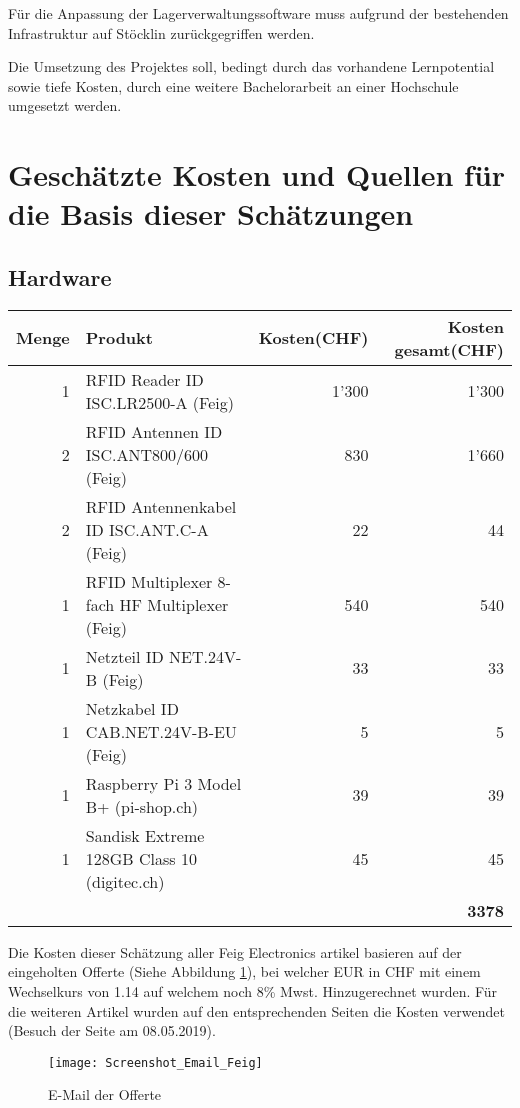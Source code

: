 Für die Anpassung der Lagerverwaltungssoftware muss aufgrund der bestehenden Infrastruktur auf Stöcklin zurückgegriffen werden.

Die Umsetzung des Projektes soll, bedingt durch das vorhandene Lernpotential sowie tiefe Kosten, durch eine weitere Bachelorarbeit an einer Hochschule umgesetzt werden.

\section{Geschätzte Kosten und Quellen für die Basis dieser Schätzungen}
\subsection{Hardware}
\begin{tabularx}{\textwidth}{|r|X|r|r|}
	\hline
	\textbf{Menge} & \textbf{Produkt} & \textbf{Kosten(CHF)} & \textbf{Kosten gesamt(CHF)} \\
	\hline
	1 & RFID Reader ID ISC.LR2500-A (Feig) & 1'300 & 1'300 \\
	\hline
	2 & RFID Antennen ID ISC.ANT800/600 (Feig)& 830 & 1'660 \\
	\hline
	2 & RFID Antennenkabel ID ISC.ANT.C-A (Feig) & 22 & 44 \\
	\hline
	1 & RFID Multiplexer 8-fach HF Multiplexer (Feig) & 540 & 540 \\
	\hline
	1 & Netzteil ID NET.24V-B (Feig) & 33 & 33 \\
	\hline
	1 & Netzkabel ID CAB.NET.24V-B-EU (Feig) & 5 & 5 \\
	\hline
	1 & Raspberry Pi 3 Model B+ (pi-shop.ch)& 39 & 39 \\
	\hline
	1 & Sandisk Extreme 128GB Class 10 (digitec.ch)& 45 & 45 \\
	\hline
	& & & \textbf{3378} \\
	\hline
\end{tabularx}
Die Kosten dieser Schätzung aller Feig Electronics artikel basieren auf der eingeholten Offerte (Siehe Abbildung \ref{fig:offerteFeig}), bei welcher EUR in CHF mit einem Wechselkurs von 1.14 auf welchem noch 8\% Mwst. Hinzugerechnet wurden.
Für die weiteren Artikel wurden auf den entsprechenden Seiten die Kosten verwendet (Besuch der Seite am 08.05.2019).

\begin{figure}[h!]
	\centering
	\texttt{[image: Screenshot\_Email\_Feig]}
	\caption{E-Mail der Offerte}
	\label{fig:offerteFeig}
\end{figure}

